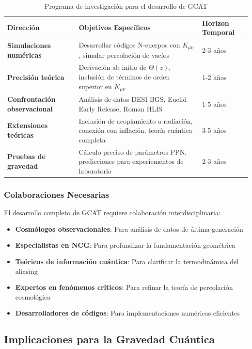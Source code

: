 \documentclass[12pt, a4paper]{article}
\theoremstyle{plain}
\theoremstyle{definition}
\begin{document}
\begin{table}[h]
\centering
\caption{Programa de investigación para el desarrollo de GCAT}
\label{tab:research_program}
\begin{tabular}{p{3cm}p{4cm}p{4cm}}
\toprule
\textbf{Dirección} & \textbf{Objetivos Específicos} & \textbf{Horizon Temporal} \\
\midrule
\textbf{Simulaciones numéricas} & Desarrollar códigos N-cuerpos con $K_{\mu\nu}$, simular percolación de vacíos & 2-3 años \\
\textbf{Precisión teórica} & Derivación ab initio de $\Theta(z)$, inclusión de términos de orden superior en $K_{\mu\nu}$ & 1-2 años \\
\textbf{Confrontación observacional} & Análisis de datos DESI BGS, Euclid Early Release, Roman HLIS & 1-5 años \\
\textbf{Extensiones teóricas} & Inclusión de acoplamiento a radiación, conexión con inflación, teoría cuántica completa & 3-5 años \\
\textbf{Pruebas de gravedad} & Cálculo preciso de parámetros PPN, predicciones para experiementos de laboratorio & 2-3 años \\
\bottomrule
\end{tabular}
\end{table}

\subsubsection{Colaboraciones Necesarias}

El desarrollo completo de GCAT requiere colaboración interdisciplinaria:
\begin{itemize}
    \item \textbf{Cosmólogos observacionales}: Para análisis de datos de última generación
    \item \textbf{Especialistas en NCG}: Para profundizar la fundamentación geométrica
    \item \textbf{Teóricos de información cuántica}: Para clarificar la termodinámica del aliasing
    \item \textbf{Expertos en fenómenos críticos}: Para refinar la teoría de percolación cosmológica
    \item \textbf{Desarrolladores de códigos}: Para implementaciones numéricas eficientes
\end{itemize}

\subsection{Implicaciones para la Gravedad Cuántica}
\end{document}

